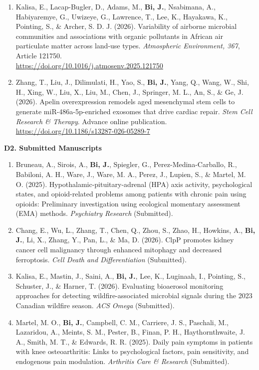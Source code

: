 \documentclass[10pt]{article}
\newcommand{\cvsubsection}[1]{%
  \Needspace{4\baselineskip}%
  \vspace{0.3em}%
  {\bfseries #1}\par
}
\begin{document}
\begin{enumerate}[leftmargin=1.6em]
\item Kalisa, E., Lacap-Bugler, D., Adams, M., \textbf{Bi, J.}, Nsabimana, A., Habiyaremye, G., Uwizeye, G., Lawrence, T., Lee, K., Hayakawa, K., Pointing, S., \& Archer, S. D. J. (2026). Variability of airborne microbial communities and associations with organic pollutants in African air particulate matter across land-use types. \emph{Atmospheric Environment, 367}, Article 121750.\\
\url{https://doi.org/10.1016/j.atmosenv.2025.121750}

\item Zhang, T., Liu, J., Dilimulati, H., Yao, S., \textbf{Bi, J.}, Yang, Q., Wang, W., Shi, H., Xing, W., Liu, X., Liu, M., Chen, J., Springer, M. L., An, S., \& Ge, J. (2026). Apelin overexpression remodels aged mesenchymal stem cells to generate miR-486a-5p-enriched exosomes that drive cardiac repair. \emph{Stem Cell Research \& Therapy}. Advance online publication.\\
\url{https://doi.org/10.1186/s13287-026-05289-7}
\end{enumerate}

\cvsubsection{D2. Submitted Manuscripts}
\begin{enumerate}[leftmargin=1.6em]
\item Bruneau, A., Sirois, A., \textbf{Bi, J.}, Spiegler, G., Perez-Medina-Carballo, R., Babiloni, A. H., Ware, J., Ware, M. A., Perez, J., Lupien, S., \& Martel, M. O. (2025). Hypothalamic-pituitary-adrenal (HPA) axis activity, psychological states, and opioid-related problems among patients with chronic pain using opioids: Preliminary investigation using ecological momentary assessment (EMA) methods. \emph{Psychiatry Research} \mbox{(Submitted)}.

\item Chang, E., Wu, L., Zhang, T., Chen, Q., Zhou, S., Zhao, H., Howkins, A., \textbf{Bi, J.}, Li, X., Zhang, Y., Pan, L., \& Ma, D. (2026). ClpP promotes kidney cancer cell malignancy through enhanced mitophagy and decreased ferroptosis. \emph{Cell Death and Differentiation} \mbox{(Submitted)}.

\item Kalisa, E., Mastin, J., Saini, A., \textbf{Bi, J.}, Lee, K., Luginaah, I., Pointing, S., Schuster, J., \& Harner, T. (2026). Evaluating bioaerosol monitoring approaches for detecting wildfire-associated microbial signals during the 2023 Canadian wildfire season. \emph{ACS Omega} \mbox{(Submitted)}.

\item Martel, M. O., \textbf{Bi, J.}, Campbell, C. M., Carriere, J. S., Paschali, M., Lazaridou, A., Meints, S. M., Pester, B., Finan, P. H., Haythornthwaite, J. A., Smith, M. T., \& Edwards, R. R. (2025). Daily pain symptoms in patients with knee osteoarthritis: Links to psychological factors, pain sensitivity, and endogenous pain modulation. \emph{Arthritis Care \& Research} \mbox{(Submitted)}.
\end{enumerate}
\end{document}
